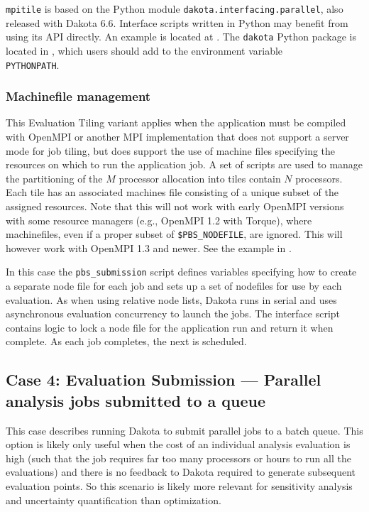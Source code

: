 {\tt mpitile} is based on the Python module {\tt dakota.interfacing.parallel}, also
released with Dakota 6.6. Interface scripts written in Python may benefit from using its 
API directly. An example is located at 
. The {\tt dakota}
Python package is located in , which users should add
to the environment variable\\{\tt PYTHONPATH}.

\subsubsection{Machinefile management}

This Evaluation Tiling variant applies when the application must be compiled 
with OpenMPI or another MPI implementation that does not support a server
mode for job tiling, but does support the use of machine files
specifying the resources on which to run the application job.  A set
of scripts are used to manage the partitioning of the $M$ processor
allocation into tiles contain $N$ processors. Each tile has an associated
machines file consisting of a unique subset of the assigned resources.  
Note that this will not work with early OpenMPI versions with some resource
managers (e.g., OpenMPI 1.2 with Torque), where machinefiles, even if
a proper subset of {\tt \$PBS\_NODEFILE}, are ignored.  This will
however work with OpenMPI 1.3 and newer.  See the example in
.

In this case the {\tt pbs\_submission} script defines variables
specifying how to create a separate node file for each job and sets up
a set of nodefiles for use by each evaluation. As when using relative
node lists, Dakota runs in serial and uses asynchronous evaluation
concurrency to launch the jobs.  The interface script
 contains logic to lock a node file for the
application run and return it when complete.  As each job completes,
the next is scheduled.

\subsection{Case 4: Evaluation Submission --- Parallel analysis jobs submitted to a queue}

This case describes running Dakota to submit parallel jobs to a batch
queue.  This option is likely only useful when the cost of an
individual analysis evaluation is high (such that the job requires far
too many processors or hours to run all the evaluations) and there is
no feedback to Dakota required to generate subsequent evaluation
points.  So this scenario is likely more relevant for sensitivity
analysis and uncertainty quantification than optimization.


